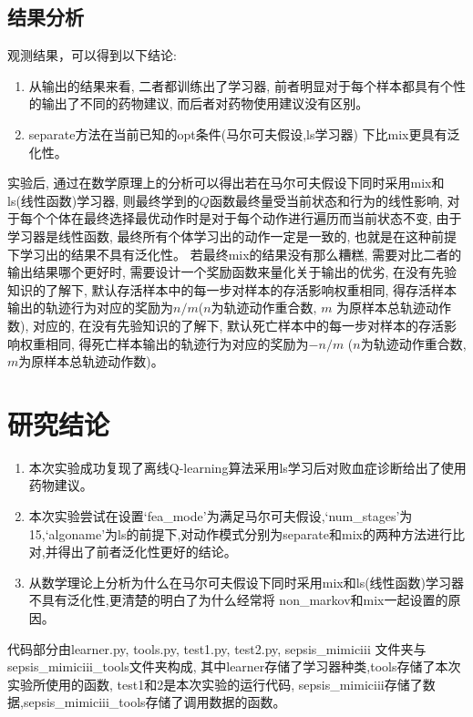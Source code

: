\documentclass[12pt,a4paper]{ctexart}
\newenvironment{enu}{\begin{enumerate}[(1)]}{\end{enumerate}}
\theoremstyle{definition}
\begin{document}
\subsection{结果分析}
观测结果，可以得到以下结论:
\begin{enu} 
\item 从输出的结果来看, 
二者都训练出了学习器, 
前者明显对于每个样本都具有个性的输出了不同的药物建议, 而后者对药物使用建议没有区别。
\item separate方法在当前已知的opt条件(马尔可夫假设,ls学习器)
下比mix更具有泛化性。
\end{enu}
实验后, 通过在数学原理上的分析可以得出若在马尔可夫假设下同时采用mix和ls(线性函数)学习器, 
则最终学到的$Q$函数最终量受当前状态和行为的线性影响, 
对于每个个体在最终选择最优动作时是对于每个动作进行遍历而当前状态不变, 
由于学习器是线性函数, 
最终所有个体学习出的动作一定是一致的, 
也就是在这种前提下学习出的结果不具有泛化性。
若最终mix的结果没有那么糟糕, 
需要对比二者的输出结果哪个更好时, 
需要设计一个奖励函数来量化关于输出的优劣, 在没有先验知识的了解下, 
默认存活样本中的每一步对样本的存活影响权重相同, 
得存活样本输出的轨迹行为对应的奖励为$n/m$($n$为轨迹动作重合数, $m$
为原样本总轨迹动作数), 
对应的, 
在没有先验知识的了解下, 
默认死亡样本中的每一步对样本的存活影响权重相同, 
得死亡样本输出的轨迹行为对应的奖励为$-n/m$
($n$为轨迹动作重合数, $m$为原样本总轨迹动作数)。


\section{研究结论}
\begin{enu} 
\item 本次实验成功复现了离线Q-learning算法采用ls学习后对败血症诊断给出了使用药物建议。
\item 本次实验尝试在设置‘fea\_mode’为满足马尔可夫假设,‘num\_stages'为15,‘algoname'为ls的前提下,对动作模式分别为separate和mix的两种方法进行比对,并得出了前者泛化性更好的结论。
\item 从数学理论上分析为什么在马尔可夫假设下同时采用mix和ls(线性函数)学习器不具有泛化性,更清楚的明白了为什么经常将
non\_markov和mix一起设置的原因。

\end{enu}
\par 
代码部分由learner.py, tools.py, test1.py, test2.py, sepsis\_mimiciii
文件夹与\\
sepsis\_mimiciii\_tools文件夹构成,
其中learner存储了学习器种类,tools存储了本次实验所使用的函数,
test1和2是本次实验的运行代码, sepsis\_mimiciii存储了数据,sepsis\_mimiciii\_tools存储了调用数据的函数。
\end{document}
